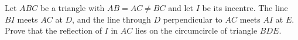 Let 
$ABC$
 be a triangle with 
$AB = AC \neq BC$
 and let 
$I$
 be its incentre. The line 
$BI$
 meets 
$AC$
 at 
$D$, 
 and the line through 
$D$
 perpendicular to 
$AC$
 meets 
$AI$
 at 
$E$. 
 Prove that the reflection of 
$I$
 in 
$AC$
 lies on the circumcircle of triangle 
$BDE$. 
